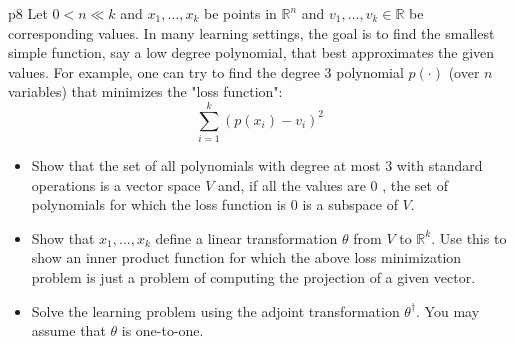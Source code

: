 \documentclass[a4paper, 11pt]{article}
\newcounter{problem}
\begin{document}
\begin{problem}{%
	}{p8%
	}
Let $0<n \ll k$ and $x_1, \ldots, x_k$ be points in $\mathbb{R}^n$ and $v_1, \ldots, v_k \in \mathbb{R}$ be corresponding values. In many learning settings, the goal is to find the smallest simple function, say a low degree polynomial, that best approximates the given values. For example, one can try to find the degree 3 polynomial $p(\cdot)$ (over $n$ variables) that minimizes the "loss function":
$$
\sum_{i=1}^k\left(p\left(x_i\right)-v_i\right)^2
$$
\begin{itemize}
	\item Show that the set of all polynomials with degree at most 3 with standard operations is a vector space $V$ and, if all the values are 0 , the set of polynomials for which the loss function is 0 is a subspace of $V$.
\item Show that $x_1, \ldots, x_k$ define a linear transformation $\theta$ from $V$ to $\mathbb{R}^k$. Use this to show an inner product function for which the above loss minimization problem is just a problem of computing the projection of a given vector.
\item Solve the learning problem using the adjoint transformation $\theta^{\dagger}$. You may assume that $\theta$ is one-to-one.
\end{itemize}
\end{problem}
\end{document}
